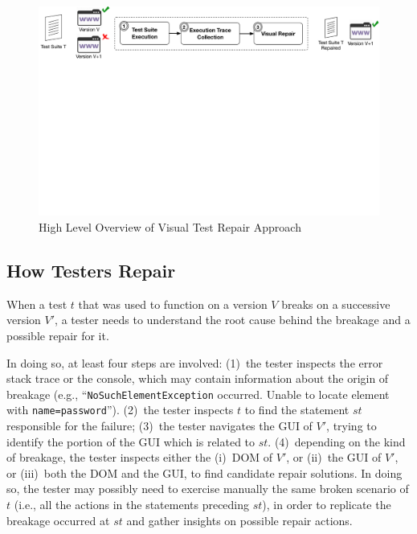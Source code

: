\begin{figure}[t]
\centering
\includegraphics[trim={0.0cm 18cm 0.0cm 0cm},clip,scale=0.435]{images/approach-reduced2}
\caption{High Level Overview of Visual Test Repair Approach}
\label{approach}
\end{figure}



\subsection{How Testers Repair}

When a test $t$ that was used to function on a version $V$  breaks on a successive version $V'$, a tester needs to understand the root cause behind the breakage and a possible repair for it. 

In doing so, at least four steps are involved: 
(1)~the tester inspects the error stack trace or the console, which may contain information about the origin of breakage (e.g., ``\texttt{NoSuchElementException} occurred. Unable to locate element with \mbox{\texttt{name=password}}''). 
(2)~the tester inspects $t$ to find the statement $st$ responsible for the failure; %
(3)~the tester navigates the GUI of $V'$, trying to identify the portion of the GUI which is related to $st$. 
(4)~depending on the kind of breakage, the tester inspects either the (i)~DOM of $V'$, or (ii)~the GUI of $V'$, or (iii)~both the DOM and the GUI, to find candidate repair solutions. In doing so, the tester may possibly need to exercise manually the same broken scenario of $t$ (i.e., all the actions in the statements preceding $st$), in order to replicate the breakage occurred at $st$ and gather insights on possible repair actions.

